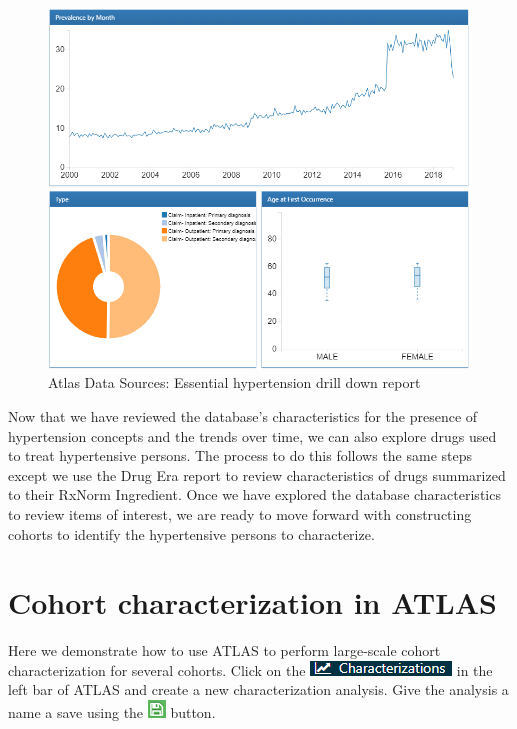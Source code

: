 \documentclass[11pt]{book}
\theoremstyle{definition}
\theoremstyle{definition}
\theoremstyle{definition}
\theoremstyle{remark}
\begin{document}
\begin{figure}

{\centering \includegraphics[width=1\linewidth]{images/Characterization/atlasDataSourcesDrillDownReport} 

}

\caption{Atlas Data Sources: Essential hypertension drill down report}\label{fig:atlasDataSourcesDrillDownReport}
\end{figure}

Now that we have reviewed the database's characteristics for the presence of hypertension concepts and the trends over time, we can also explore drugs used to treat hypertensive persons. The process to do this follows the same steps except we use the Drug Era report to review characteristics of drugs summarized to their RxNorm Ingredient. Once we have explored the database characteristics to review items of interest, we are ready to move forward with constructing cohorts to identify the hypertensive persons to characterize.

\hypertarget{cohort-characterization-in-atlas}{%
\section{Cohort characterization in ATLAS}\label{cohort-characterization-in-atlas}}

Here we demonstrate how to use ATLAS to perform large-scale cohort characterization for several cohorts. Click on the \includegraphics{images/Characterization/atlasCharacterizationMenuItem.png} in the left bar of ATLAS and create a new characterization analysis. Give the analysis a name a save using the \includegraphics{images/PopulationLevelEstimation/save.png} button.
\end{document}
